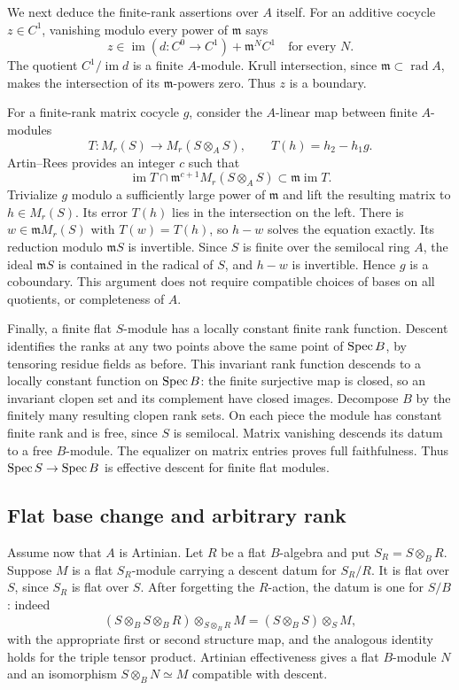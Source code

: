 We next deduce the finite-rank assertions over $A$ itself. For an additive cocycle $z\in C^1$, vanishing modulo every power of $\mathfrak m$ says
\[
 z\in\operatorname{im}(d:C^0\to C^1)+\mathfrak m^N C^1
 \quad\text{for every }N.
\]
The quotient $C^1/\operatorname{im}d$ is a finite $A$-module. Krull intersection, since $\mathfrak m\subset\operatorname{rad}A$, makes the intersection of its $\mathfrak m$-powers zero. Thus $z$ is a boundary.

For a finite-rank matrix cocycle $g$, consider the $A$-linear map between finite $A$-modules
\[
 T:M_r(S)\longrightarrow M_r(S\otimes_AS),
 \qquad T(h)=h_2-h_1g.
\]
Artin--Rees provides an integer $c$ such that
\[
 \operatorname{im}T\cap\mathfrak m^{c+1}M_r(S\otimes_AS)
                    \subset\mathfrak m\operatorname{im}T.
\]
Trivialize $g$ modulo a sufficiently large power of $\mathfrak m$ and lift the resulting matrix to $h\in M_r(S)$. Its error $T(h)$ lies in the intersection on the left. There is $w\in\mathfrak mM_r(S)$ with $T(w)=T(h)$, so $h-w$ solves the equation exactly. Its reduction modulo $\mathfrak mS$ is invertible. Since $S$ is finite over the semilocal ring $A$, the ideal $\mathfrak mS$ is contained in the radical of $S$, and $h-w$ is invertible. Hence $g$ is a coboundary. This argument does not require compatible choices of bases on all quotients, or completeness of $A$.

Finally, a finite flat $S$-module has a locally constant finite rank function. Descent identifies the ranks at any two points above the same point of $\operatorname{Spec} B$, by tensoring residue fields as before. This invariant rank function descends to a locally constant function on $\operatorname{Spec} B$: the finite surjective map is closed, so an invariant clopen set and its complement have closed images. Decompose $B$ by the finitely many resulting clopen rank sets. On each piece the module has constant finite rank and is free, since $S$ is semilocal. Matrix vanishing descends its datum to a free $B$-module. The equalizer on matrix entries proves full faithfulness. Thus $\operatorname{Spec} S\to\operatorname{Spec} B$ is effective descent for finite flat modules.

\subsection{Flat base change and arbitrary rank}

Assume now that $A$ is Artinian. Let $R$ be a flat $B$-algebra and put $S_R=S\otimes_BR$. Suppose $M$ is a flat $S_R$-module carrying a descent datum for $S_R/R$. It is flat over $S$, since $S_R$ is flat over $S$. After forgetting the $R$-action, the datum is one for $S/B$: indeed
\[
 (S\otimes_BS\otimes_BR)\otimes_{S\otimes_BR}M
       =(S\otimes_BS)\otimes_SM,
\]
with the appropriate first or second structure map, and the analogous identity holds for the triple tensor product. Artinian effectiveness gives a flat $B$-module $N$ and an isomorphism $S\otimes_BN\simeq M$ compatible with descent.

